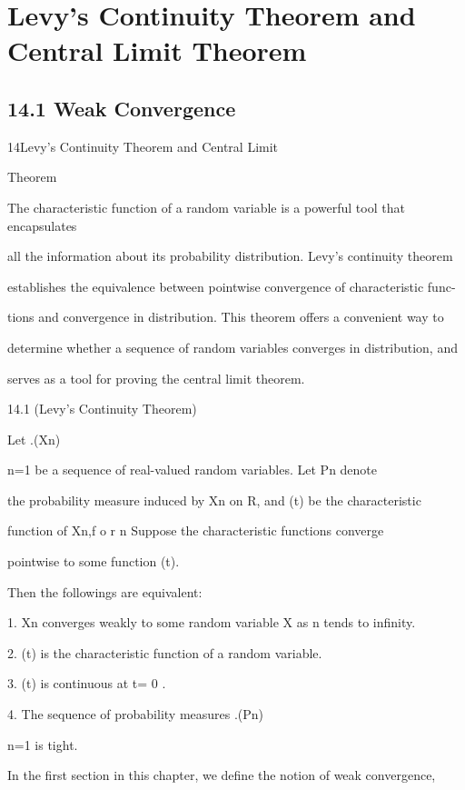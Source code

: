 \section*{Levy's Continuity Theorem and Central Limit Theorem}

\subsection*{14.1 Weak Convergence}

14Levy's Continuity Theorem and Central Limit

Theorem

The characteristic function of a random variable is a powerful tool that encapsulates

all the information about its probability distribution. Levy's continuity theorem

establishes the equivalence between pointwise convergence of characteristic func-

tions and convergence in distribution. This theorem offers a convenient way to

determine whether a sequence of random variables converges in distribution, and

serves as a tool for proving the central limit theorem.

\begin{thmbox}{14.1 (Levy's Continuity Theorem)}
\end{thmbox}

Let .(Xn)\infty

n=1 be a sequence of real-valued random variables. Let Pn denote

the probability measure induced by Xn on R, and \phin(t) be the characteristic

function of Xn,f o r n Suppose the characteristic functions converge

pointwise to some function \phi(t).

Then the followings are equivalent:

1. Xn converges weakly to some random variable X as n tends to infinity.

2. \phi(t) is the characteristic function of a random variable.

3. \phi(t) is continuous at t= 0 .

4. The sequence of probability measures .(Pn)\infty

n=1 is tight.

In the first section in this chapter, we define the notion of weak convergence,

